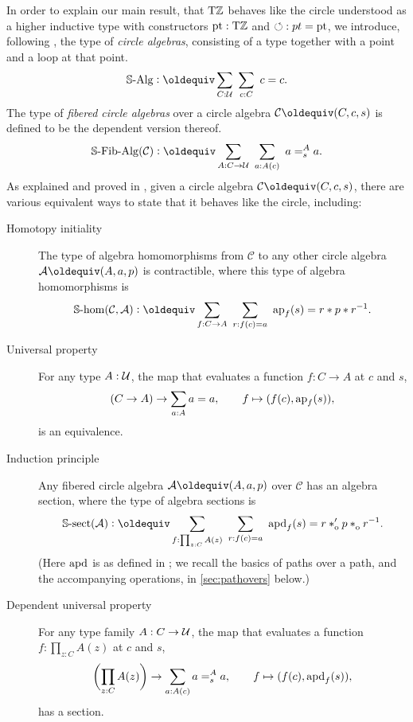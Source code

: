 \documentclass[a4paper,12pt]{amsart}
\begin{document}
In order to explain our main result,
that ${\mathrm{T}\mathbb{Z}}$ behaves like the circle understood as a higher inductive type
with constructors ${\mathord{\mathrm{pt}}} : {\mathrm{T}\mathbb{Z}}$ and ${\circlearrowleft} : pt = {\mathord{\mathrm{pt}}}$,
we introduce, following \cite{sojakova:hits-hias}, the type of \emph{circle algebras},
consisting of a type together with a point and a loop at that point.
\[
  \CircleAlg \defeq \sum_{C:\UU}~\sum_{c:C}~ c = c.
\]
The type of \emph{fibered circle algebras} over a circle algebra
$\mathcal C \jdeq (C,c,s)$ is defined to be the dependent version thereof.
\[
  \CircleFibAlg(\mathcal C) \defeq
  \sum_{A : C \to \UU}~\sum_{a:A(c)}~ a=^A_s a.
\]
As explained and proved in \cite[Thm.~50]{sojakova:hits-hias},
given a circle algebra $\mathcal C \jdeq (C,c,s)$,
there are various equivalent ways to state that it behaves like the circle,
including:
\begin{description}
\item[Homotopy initiality]
  The type of algebra homomorphisms
  from $\mathcal C$ to any other circle algebra $\mathcal A\jdeq(A,a,p)$
  is contractible, where this type of algebra homomorphisms is
  \begin{equation}\label{eq:circle-hom}
    \Shom(\mathcal C,\mathcal A) \defeq
    \sum_{f : C \to A}~\sum_{r:f(c)=a}~ \ap{f}(s)=r \ct p \ct r^{-1}.
  \end{equation}
\item[Universal property]
  For any type $A:\mathcal{U}$, the map that evaluates a function $f : C \to A$
  at $c$ and $s$,
  \begin{equation}\label{eq:eval}
    (C \to A) \to \sum_{a : A} a=a,
    \qquad
    f \mapsto (f(c), \mathop{{\mathrm{ap}}_{f}}(s)),
  \end{equation}
  is an equivalence.
\item[Induction principle]
  Any fibered circle algebra $\mathcal A\jdeq (A,a,p)$
  over $\mathcal C$ has an algebra section,
  where the type of algebra sections is
  \begin{equation}\label{eq:circle-sect}
    \Ssect(\mathcal A) \defeq
    \sum_{f: \prod_{z:C} A(z)}~
    \sum_{r: f(c) = a}~
    {\apd{f}(s) = r \ctop p \cto r^{-1}}.
  \end{equation}
  (Here $\mathop{{\mathrm{apd}}_{}}$ is as defined in \cite[2.3]{hottbook};
  we recall the basics of paths over a path, and the accompanying
  operations, in \cref{sec:pathovers} below.)
\item[Dependent universal property]
  For any type family $A : C \to \mathcal{U}$, the map that evaluates a function
  $f : \prod_{z:C} A(z)$ at $c$ and $s$,
  \begin{equation}\label{eq:dep-eval}
    \biggl(\prod_{z:C} A(z)\biggr) \to \sum_{a:A(c)} a=^A_s a,
    \qquad
    f \mapsto (f(c), \mathop{{\mathrm{apd}}_{f}}(s)),
  \end{equation}
  has a section.
\end{description}
\end{document}

